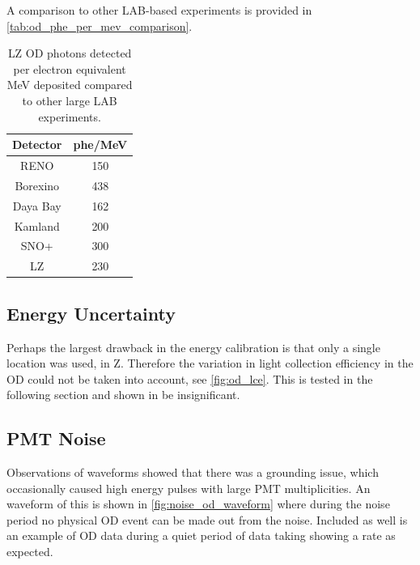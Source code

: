 

\par
A comparison to other LAB-based experiments is provided in \autoref{tab:od_phe_per_mev_comparison}.

\begin{table}[!htbp]%
    \centering
    \begin{tabular}{c|c}
        Detector & phe/MeV \\ \hline
        RENO     & 150 \cite{reno_phe_per_mev_ref} \\
        Borexino & 438 \cite{pablo_mosteiro_thesis_ref} \\
        Daya Bay & 162 \cite{dayabay_phe_per_mev_ref} \\
        Kamland  & 200 \cite{kamland_phe_per_mev_ref} \\
        SNO+     & 300 \cite{snoplus_phe_per_mev_ref} \\
        LZ       & 230 
    \end{tabular}
    \caption{LZ OD photons detected per electron equivalent MeV deposited compared to other large LAB experiments.}
    \label{tab:od_phe_per_mev_comparison}
\end{table}

\subsection{Energy Uncertainty}
\par
Perhaps the largest drawback in the energy calibration is that only a single location was used, in Z.
Therefore the variation in light collection efficiency in the OD could not be taken into account, see \autoref{fig:od_lce}.
This is tested in the following section and shown in be insignificant.


\subsection{PMT Noise}
\par
Observations of waveforms showed that there was a grounding issue, which occasionally caused high energy pulses with large PMT multiplicities.
An waveform of this is shown in \autoref{fig:noise_od_waveform} where during the noise period no physical OD event can be made out from the noise.
Included as well is an example of OD data during a quiet period of data taking showing a rate as expected.



